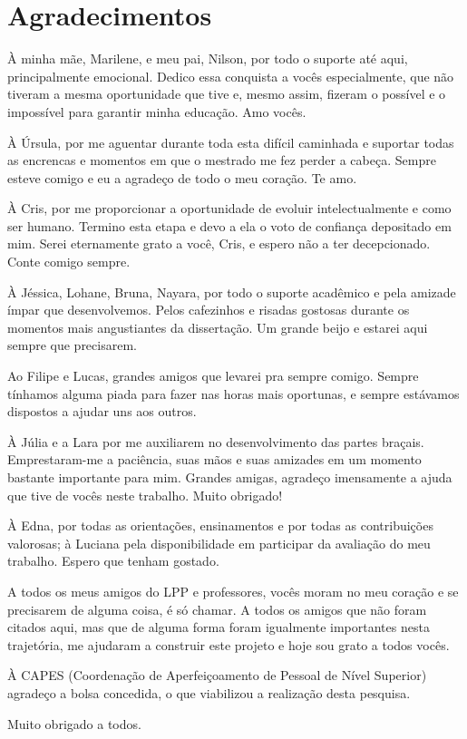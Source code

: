 \section*{Agradecimentos}
\vspace*{1.5cm}
\thispagestyle{empty}
\begin{onehalfspace}
\noindent À minha mãe, Marilene, e meu pai, Nilson, por todo o suporte até aqui, principalmente emocional. Dedico essa conquista a vocês especialmente, que não tiveram a mesma oportunidade que tive e, mesmo assim, fizeram o possível e o impossível para garantir minha educação. Amo vocês.\par
\noindent À Úrsula, por me aguentar durante toda esta difícil caminhada e suportar todas as encrencas e momentos em que o mestrado me fez perder a cabeça. Sempre esteve comigo e eu a agradeço de todo o meu coração. Te amo.\par
\noindent À Cris, por me proporcionar a oportunidade de evoluir intelectualmente e como ser humano. Termino esta etapa e devo a ela o voto de confiança depositado em mim. Serei eternamente grato a você, Cris, e espero não a ter decepcionado. Conte comigo sempre.\par
\noindent À Jéssica, Lohane, Bruna, Nayara, por todo o suporte acadêmico e pela amizade ímpar que desenvolvemos. Pelos cafezinhos e risadas gostosas durante os momentos mais angustiantes da dissertação. Um grande beijo e estarei aqui sempre que precisarem.\par
\noindent Ao Filipe e Lucas, grandes amigos que levarei pra sempre comigo. Sempre tínhamos alguma piada para fazer nas horas mais oportunas, e sempre estávamos dispostos a ajudar uns aos outros.\par
\noindent À Júlia e a Lara por me auxiliarem no desenvolvimento das partes braçais. Emprestaram-me a paciência, suas mãos e suas amizades em um momento bastante importante para mim. Grandes amigas, agradeço imensamente a ajuda que tive de vocês neste trabalho. Muito obrigado!\par
\noindent À Edna, por todas as orientações, ensinamentos e por todas as contribuições valorosas; à Luciana pela disponibilidade em participar da avaliação do meu trabalho. Espero que tenham gostado.\par
\noindent A todos os meus amigos do LPP e professores, vocês moram no meu coração e se precisarem de alguma coisa, é só chamar. A todos os amigos que não foram citados aqui, mas que de alguma forma foram igualmente importantes nesta trajetória, me ajudaram a construir este projeto e hoje sou grato a todos vocês.\par
\noindent À CAPES (Coordenação de Aperfeiçoamento de Pessoal de Nível Superior) agradeço a bolsa concedida, o que viabilizou a realização desta pesquisa.\vspace*{0.5cm}

\noindent Muito obrigado a todos.\par
\end{onehalfspace}

